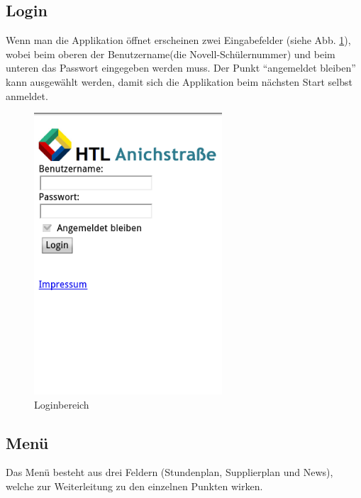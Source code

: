 \subsection{Login}
Wenn man die Applikation öffnet erscheinen zwei Eingabefelder (siehe Abb. \ref{fig:App_Login}), wobei beim oberen der Benutzername(die Novell-Schülernummer) und beim unteren das Passwort eingegeben werden muss. Der Punkt \enquote{angemeldet bleiben} kann ausgewählt werden, damit sich die Applikation beim nächsten Start selbst anmeldet. 


\begin{figure}[H]
\centering
\includegraphics[keepaspectratio=true, width=7cm]{images/app_instructions/appLogin.png}
\caption{Loginbereich}
\label{fig:App_Login}
\end{figure}

\subsection{Menü}

Das Menü besteht aus drei Feldern (Stundenplan, Supplierplan und News), welche zur Weiterleitung zu den einzelnen Punkten wirken.

